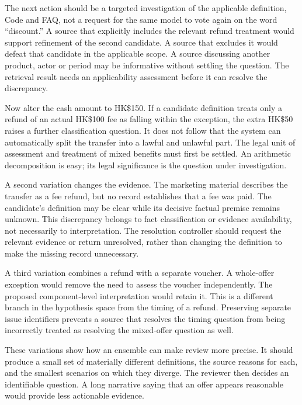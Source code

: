\documentclass[12pt,a4paper,oneside,openany]{book}
\begin{document}
The next action should be a targeted investigation of the applicable definition,
Code and FAQ, not a request for the same model to vote again on the word
``discount.'' A source that explicitly includes the relevant refund treatment
would support refinement of the second candidate. A source that excludes it
would defeat that candidate in the applicable scope. A source discussing
another product, actor or period may be informative without settling the
question. The retrieval result needs an applicability assessment before it can
resolve the discrepancy.

Now alter the cash amount to HK\$150. If a candidate definition treats only a
refund of an actual HK\$100 fee as falling within the exception, the extra
HK\$50 raises a further classification question. It does not follow that the
system can automatically split the transfer into a lawful and unlawful part.
The legal unit of assessment and treatment of mixed benefits must first be
settled. An arithmetic decomposition is easy; its legal significance is the
question under investigation.

A second variation changes the evidence. The marketing material describes the
transfer as a fee refund, but no record establishes that a fee was paid. The
candidate's definition may be clear while its decisive factual premise remains
unknown. This discrepancy belongs to fact classification or evidence
availability, not necessarily to interpretation. The resolution controller
should request the relevant evidence or return unresolved, rather than
changing the definition to make the missing record unnecessary.

A third variation combines a refund with a separate voucher. A whole-offer
exception would remove the need to assess the voucher independently. The
proposed component-level interpretation would retain it. This is a different
branch in the hypothesis space from the timing of a refund. Preserving separate
issue identifiers prevents a source that resolves the timing question from
being incorrectly treated as resolving the mixed-offer question as well.

These variations show how an ensemble can make review more precise. It should
produce a small set of materially different definitions, the source reasons
for each, and the smallest scenarios on which they diverge. The reviewer then
decides an identifiable question. A long narrative saying that an offer appears
reasonable would provide less actionable evidence.
\end{document}
